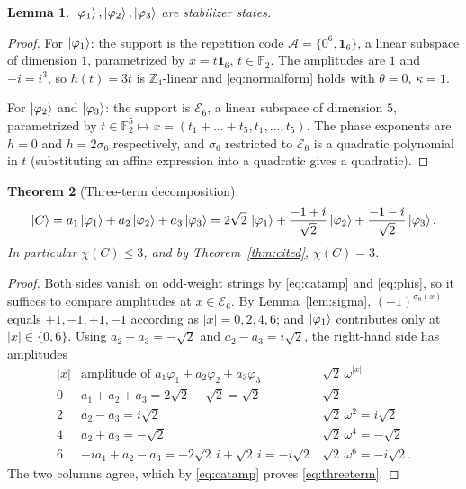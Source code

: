 \documentclass[11pt]{article}
\theoremstyle{plain}
\newtheorem{theorem}{Theorem}[section]
\newtheorem{lemma}[theorem]{Lemma}
\theoremstyle{definition}
\newcommand{\F}{\mathbb{F}}
\newcommand{\Z}{\mathbb{Z}}
\newcommand{\Ev}{\mathcal{E}}
\newcommand{\one}{\mathbf{1}}
\newcommand{\wt}[1]{\lvert #1\rvert}
\begin{document}
\begin{lemma}\label{lem:phistab}
$\ket{\varphi_1},\ket{\varphi_2},\ket{\varphi_3}$ are stabilizer states.
\end{lemma}

\begin{proof}
For $\ket{\varphi_1}$: the support is the repetition code
$\mathcal A=\{0^6,\one_6\}$, a linear subspace of dimension $1$, parametrized by
$x=t\one_6$, $t\in\F_2$. The amplitudes are $1$ and $-i=i^3$, so
$h(t)=3t$ is $\Z_4$-linear and \eqref{eq:normalform} holds with $\theta=0$,
$\kappa=1$.

For $\ket{\varphi_2}$ and $\ket{\varphi_3}$: the support is $\Ev_6$, a linear subspace
of dimension $5$, parametrized by $t\in\F_2^5\mapsto x=(t_1+\dots+t_5,t_1,\dots,t_5)$.
The phase exponents are $h=0$ and $h=2\sigma_6$ respectively, and $\sigma_6$ restricted
to $\Ev_6$ is a quadratic polynomial in $t$ (substituting an affine expression into a
quadratic gives a quadratic).
\end{proof}

\begin{theorem}[Three-term decomposition]\label{thm:threeterm}
\begin{equation}\label{eq:threeterm}
\ket C=a_1\ket{\varphi_1}+a_2\ket{\varphi_2}+a_3\ket{\varphi_3}
=2\sqrt2\,\ket{\varphi_1}+\frac{-1+i}{\sqrt2}\ket{\varphi_2}+\frac{-1-i}{\sqrt2}\ket{\varphi_3}.
\end{equation}
In particular $\chi(C)\le3$, and by Theorem~\ref{thm:cited}, $\chi(C)=3$.
\end{theorem}

\begin{proof}
Both sides vanish on odd-weight strings by \eqref{eq:catamp} and \eqref{eq:phis}, so it
suffices to compare amplitudes at $x\in\Ev_6$. By Lemma~\ref{lem:sigma},
$(-1)^{\sigma_6(x)}$ equals $+1,-1,+1,-1$ according as $\wt x=0,2,4,6$; and
$\ket{\varphi_1}$ contributes only at $\wt x\in\{0,6\}$. Using
$a_2+a_3=-\sqrt2$ and $a_2-a_3=i\sqrt2$, the right-hand side has amplitudes
\[
\begin{array}{c|c|c}
\wt x & \text{amplitude of }a_1\varphi_1+a_2\varphi_2+a_3\varphi_3 & \sqrt2\,\omega^{\wt x}\\ \hline
0 & a_1+a_2+a_3=2\sqrt2-\sqrt2=\sqrt2 & \sqrt2\\
2 & a_2-a_3=i\sqrt2 & \sqrt2\,\omega^2=i\sqrt2\\
4 & a_2+a_3=-\sqrt2 & \sqrt2\,\omega^4=-\sqrt2\\
6 & -ia_1+a_2-a_3=-2\sqrt2\,i+\sqrt2\,i=-i\sqrt2 & \sqrt2\,\omega^6=-i\sqrt2 .
\end{array}
\]
The two columns agree, which by \eqref{eq:catamp} proves \eqref{eq:threeterm}.
\end{proof}
\end{document}
